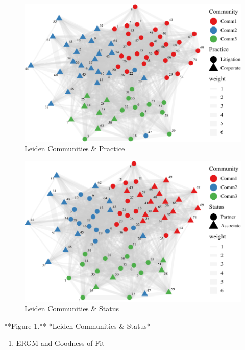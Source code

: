\documentclass[
]{article}
\newenvironment{Shaded}{\begin{snugshade}}{\end{snugshade}}
\newcommand{\NormalTok}[1]{#1}
\providecommand{\tightlist}{%
  \setlength{\itemsep}{0pt}\setlength{\parskip}{0pt}}
\begin{document}
\begin{figure}

{\centering \includegraphics[width=0.6\linewidth]{46062_files/figure-latex/plot_practice-1} 

}

\caption{Leiden Communities \& Practice}\label{fig:plot_practice}
\end{figure}

\begin{figure}

{\centering \includegraphics[width=0.6\linewidth]{46062_files/figure-latex/plot_status-1} 

}

\caption{Leiden Communities \& Status}\label{fig:plot_status}
\end{figure}

\begin{Shaded}
\begin{Highlighting}[]
\NormalTok{**Figure 1.** *Leiden Communities \& Status*}
\end{Highlighting}
\end{Shaded}

\begin{enumerate}
\def\labelenumi{\arabic{enumi}.}
\setcounter{enumi}{2}
\tightlist
\item
  ERGM and Goodness of Fit
\end{enumerate}
\end{document}

